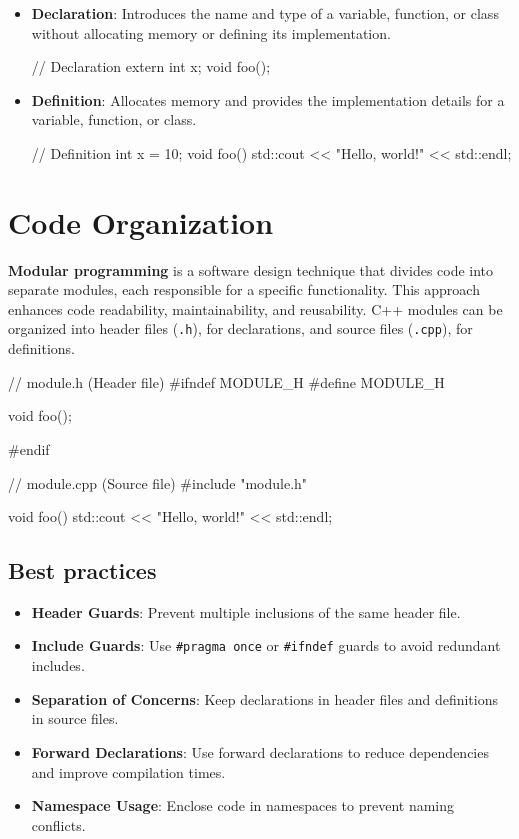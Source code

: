 \begin{itemize}
    \item \textbf{Declaration}: Introduces the name and type of a variable, function, or class without allocating memory or defining its implementation.
\begin{codeblock}[language=C++, numbers=none]
// Declaration
extern int x;
void foo();
\end{codeblock}
    \item \textbf{Definition}: Allocates memory and provides the implementation details for a variable, function, or class.
\begin{codeblock}[language=C++, numbers=none]
// Definition
int x = 10;
void foo() {
    std::cout << "Hello, world!" << std::endl;
}
\end{codeblock}
\end{itemize}


\section{Code Organization}

\textbf{Modular programming} is a software design technique that divides code into separate modules, each responsible for a specific functionality. This approach enhances code readability, maintainability, and reusability.
C++ modules can be organized into header files (\texttt{.h}), for declarations, and source files (\texttt{.cpp}), for definitions.

\begin{exampleblock}
\begin{codeblock}[language=C++]
// module.h (Header file)
#ifndef MODULE_H
#define MODULE_H

void foo();

#endif

// module.cpp (Source file)
#include "module.h"

void foo() {
    std::cout << "Hello, world!" << std::endl;
}
\end{codeblock}
\end{exampleblock}

\subsection{Best practices}

\begin{itemize}
    \item \textbf{Header Guards}: Prevent multiple inclusions of the same header file.
    \item \textbf{Include Guards}: Use \texttt{\#pragma once} or \texttt{\#ifndef} guards to avoid redundant includes.
    \item \textbf{Separation of Concerns}: Keep declarations in header files and definitions in source files.
    \item \textbf{Forward Declarations}: Use forward declarations to reduce dependencies and improve compilation times.
    \item \textbf{Namespace Usage}: Enclose code in namespaces to prevent naming conflicts.
\end{itemize}

